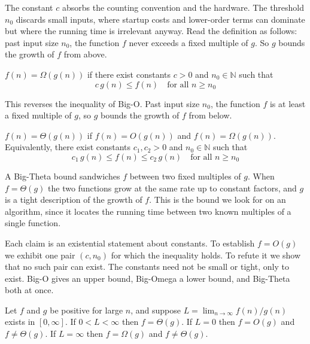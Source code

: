 The constant $c$ absorbs the counting convention and the hardware. The threshold $n_0$ discards small inputs, where startup costs and lower-order terms can dominate but where the running time is irrelevant anyway. Read the definition as follows: past input size $n_0$, the function $f$ never exceeds a fixed multiple of $g$. So $g$ bounds the growth of $f$ from above.

\medskip

\begin{definition}
$f(n) = \Omega(g(n))$ if there exist constants $c > 0$ and $n_0 \in \mathbb{N}$ such that
\[
  c\,g(n) \le f(n) \quad\text{for all } n \ge n_0
\]
\end{definition}

This reverses the inequality of Big-O. Past input size $n_0$, the function $f$ is at least a fixed multiple of $g$, so $g$ bounds the growth of $f$ from below.

\medskip

\begin{definition}
$f(n) = \Theta(g(n))$ if $f(n) = O(g(n))$ and $f(n) = \Omega(g(n))$. Equivalently, there exist constants $c_1, c_2 > 0$ and $n_0 \in \mathbb{N}$ such that
\[
  c_1\,g(n) \le f(n) \le c_2\,g(n) \quad\text{for all } n \ge n_0
\]
\end{definition}

A Big-Theta bound sandwiches $f$ between two fixed multiples of $g$. When $f = \Theta(g)$ the two functions grow at the same rate up to constant factors, and $g$ is a tight description of the growth of $f$. This is the bound we look for on an algorithm, since it locates the running time between two known multiples of a single function.

\begin{keybox}
Each claim is an existential statement about constants. To establish $f = O(g)$ we exhibit one pair $(c, n_0)$ for which the inequality holds. To refute it we show that no such pair can exist. The constants need not be small or tight, only to exist. Big-O gives an upper bound, Big-Omega a lower bound, and Big-Theta both at once.
\end{keybox}

\medskip

\begin{theorem}
Let $f$ and $g$ be positive for large $n$, and suppose $L = \lim_{n \to \infty} f(n)/g(n)$ exists in $[0, \infty]$. If $0 < L < \infty$ then $f = \Theta(g)$. If $L = 0$ then $f = O(g)$ and $f \ne \Theta(g)$. If $L = \infty$ then $f = \Omega(g)$ and $f \ne \Theta(g)$.
\end{theorem}

